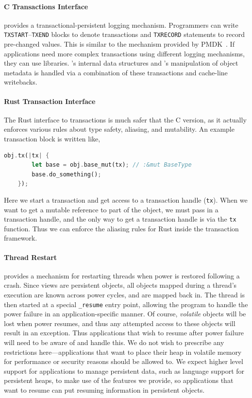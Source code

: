 \paragraph{C Transactions Interface}
\Twizzler provides a transactional-persistent logging mechanism.
Programmers can write \texttt{TXSTART}--\texttt{TXEND} blocks to denote transactions and \texttt{TXRECORD}
statements to record pre-changed values. This is similar to the mechanism provided by
PMDK~\cite{libpmem}. If applications need more complex
transactions using different logging mechanisms, they can use libraries. \Twizzler's internal data
structures and \libcore's manipulation of object metadata is handled via a combination of these
transactions and cache-line writebacks.


\paragraph{Rust Transaction Interface}

The Rust interface to transactions is much safer that the C version, as it actually enforces various rules about type
safety, aliasing, and mutability. An example transaction block is written like,

\begin{lstlisting}[language=Rust]
    obj.tx(|tx| {
        let base = obj.base_mut(tx); // :&mut BaseType
        base.do_something();
    });
\end{lstlisting}

Here we start a transaction and get access to a transaction handle (\texttt{tx}). When we want to get a mutable
reference to part of the object, we must pass in a transaction handle, and the only way to get a transaction handle is
via the \texttt{tx} function. Thus we can enforce the aliasing rules for Rust inside the transaction framework.

\paragraph{Thread Restart}

\Twizzler provides a mechanism for restarting threads when power is restored following a crash.
Since views are persistent objects, all objects mapped during a thread's execution are known across
power cycles, and are mapped back in. The thread is then started at a special \texttt{\_resume}
entry point, allowing the program to handle the power failure in an application-specific manner.  Of
course, \emph{volatile} objects will be lost when power resumes, and thus any attempted access to
these objects will result in an exception. Thus applications that wish to resume after power failure
will need to be aware of and handle this. We do not wish to prescribe any restrictions
here---applications that want to place their heap in volatile memory for performance or security
reasons should be allowed to. We expect higher level support for applications to manage persistent
data, such as language support for persistent heaps, to make use of the features we provide, so
applications that want to resume can put resuming information in persistent objects.


